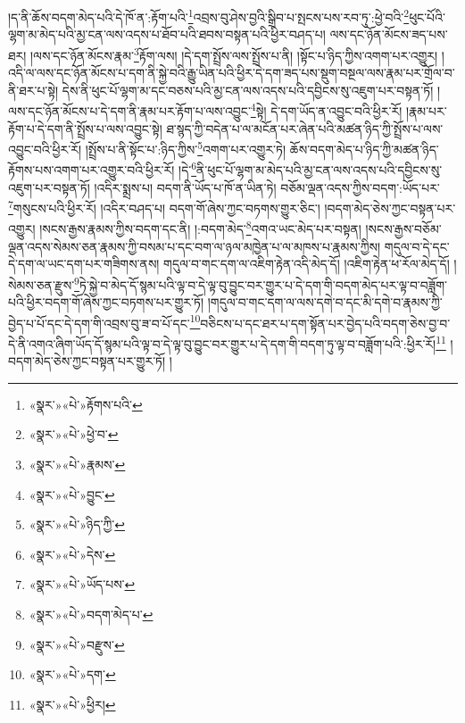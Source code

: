 །ད་ནི་ཆོས་བདག་མེད་པའི་དེ་ཁོ་ན་:རྟོག་པའི་\footnote{«སྣར་»«པེ་»རྟོགས་པའི་}འབྲས་བུ་ཤེས་བྱའི་སྒྲིབ་པ་སྤངས་པས་རབ་ཏུ་:ཕྱེ་བའི་\footnote{«སྣར་»«པེ་»ཕྱེ་བ་}ཕུང་པོའི་ལྷག་མ་མེད་པའི་མྱ་ངན་ལས་འདས་པ་ཐོབ་པའི་ཐབས་བསྟན་པའི་ཕྱིར་བཤད་པ། ལས་དང་ཉོན་མོངས་ཟད་པས་ཐར། །ལས་དང་ཉོན་མོངས་རྣམ་\footnote{«སྣར་»«པེ་»རྣམས་}རྟོག་ལས། །དེ་དག་སྤྲོས་ལས་སྤྲོས་པ་ནི། །སྟོང་པ་ཉིད་ཀྱིས་འགག་པར་འགྱུར། །འདི་ལ་ལས་དང་ཉོན་མོངས་པ་དག་ནི་སྐྱེ་བའི་རྒྱུ་ཡིན་པའི་ཕྱིར་དེ་དག་ཟད་པས་སྡུག་བསྔལ་ལས་རྣམ་པར་གྲོལ་བ་ནི་ཐར་པ་སྟེ། དེས་ནི་ཕུང་པོ་ལྷག་མ་དང་བཅས་པའི་མྱ་ངན་ལས་འདས་པའི་དབྱིངས་སུ་འཇུག་པར་བསྟན་ཏོ། །ལས་དང་ཉོན་མོངས་པ་དེ་དག་ནི་རྣམ་པར་རྟོག་པ་ལས་འབྱུང་\footnote{«སྣར་»«པེ་»བྱུང་}སྟེ། དེ་དག་ཡོད་ན་འབྱུང་བའི་ཕྱིར་རོ། །རྣམ་པར་རྟོག་པ་དེ་དག་ནི་སྤྲོས་པ་ལས་འབྱུང་སྟེ། ཐ་སྙད་ཀྱི་བདེན་པ་ལ་མངོན་པར་ཞེན་པའི་མཚན་ཉིད་ཀྱི་སྤྲོས་པ་ལས་འབྱུང་བའི་ཕྱིར་རོ། །སྤྲོས་པ་ནི་སྟོང་པ་:ཉིད་ཀྱིས་\footnote{«སྣར་»«པེ་»ཉིད་ཀྱི་}འགག་པར་འགྱུར་ཏེ། ཆོས་བདག་མེད་པ་ཉིད་ཀྱི་མཚན་ཉིད་རྟོགས་པས་འགག་པར་འགྱུར་བའི་ཕྱིར་རོ། །དེ་\footnote{«སྣར་»«པེ་»དེས་}ནི་ཕུང་པོ་ལྷག་མ་མེད་པའི་མྱ་ངན་ལས་འདས་པའི་དབྱིངས་སུ་འཇུག་པར་བསྟན་ཏོ། །འདིར་སྨྲས་པ། བདག་ནི་ཡོད་པ་ཁོ་ན་ཡིན་ཏེ། བཅོམ་ལྡན་འདས་ཀྱིས་བདག་:ཡོད་པར་\footnote{«སྣར་»«པེ་»ཡོད་པས་}གསུངས་པའི་ཕྱིར་རོ། །འདིར་བཤད་པ། བདག་གོ་ཞེས་ཀྱང་བཏགས་གྱུར་ཅིང་། །བདག་མེད་ཅེས་ཀྱང་བསྟན་པར་འགྱུར། །སངས་རྒྱས་རྣམས་ཀྱིས་བདག་དང་ནི། །:བདག་མེད་\footnote{«སྣར་»«པེ་»བདག་མེད་པ་}འགའ་ཡང་མེད་པར་བསྟན། །སངས་རྒྱས་བཅོམ་ལྡན་འདས་སེམས་ཅན་རྣམས་ཀྱི་བསམ་པ་དང་བག་ལ་ཉལ་མཁྱེན་པ་ལ་མཁས་པ་རྣམས་ཀྱིས། གདུལ་བ་དེ་དང་དེ་དག་ལ་ཡང་དག་པར་གཟིགས་ནས། གདུལ་བ་གང་དག་ལ་འཇིག་རྟེན་འདི་མེད་དོ། །འཇིག་རྟེན་ཕ་རོལ་མེད་དོ། །སེམས་ཅན་རྫུས་\footnote{«སྣར་»«པེ་»བརྫུས་}ཏེ་སྐྱེ་བ་མེད་དོ་སྙམ་པའི་ལྟ་བ་དེ་ལྟ་བུ་བྱུང་བར་གྱུར་པ་དེ་དག་གི་བདག་མེད་པར་ལྟ་བ་བཟློག་པའི་ཕྱིར་བདག་གོ་ཞེས་ཀྱང་བཏགས་པར་གྱུར་ཏོ། །གདུལ་བ་གང་དག་ལ་ལས་དགེ་བ་དང་མི་དགེ་བ་རྣམས་ཀྱི་བྱེད་པ་པོ་དང་དེ་དག་གི་འབྲས་བུ་ཟ་བ་པོ་དང་\footnote{«སྣར་»«པེ་»དག་}བཅིངས་པ་དང་ཐར་པ་དག་སྟོན་པར་བྱེད་པའི་བདག་ཅེས་བྱ་བ་དེ་ནི་འགའ་ཞིག་ཡོད་དོ་སྙམ་པའི་ལྟ་བ་དེ་ལྟ་བུ་བྱུང་བར་གྱུར་པ་དེ་དག་གི་བདག་ཏུ་ལྟ་བ་བཟློག་པའི་:ཕྱིར་རོ།\footnote{«སྣར་»«པེ་»ཕྱིར།} །བདག་མེད་ཅེས་ཀྱང་བསྟན་པར་གྱུར་ཏོ། །
